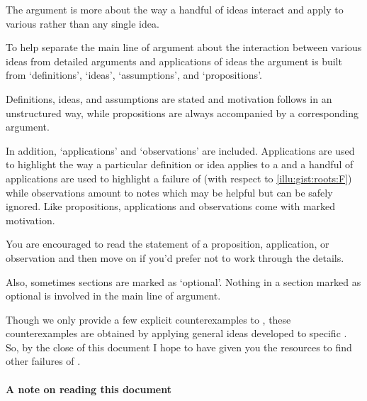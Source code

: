 \begin{note}
  The argument is more about the way a handful of ideas interact and apply to various  rather than any single idea.

  To help separate the main line of argument about the interaction between various ideas from detailed arguments and applications of ideas the argument is built from `definitions', `ideas', `assumptions', and `propositions'.

  Definitions, ideas, and assumptions are stated and motivation follows in an unstructured way, while propositions are always accompanied by a corresponding argument.

  In addition, `applications' and `observations' are included.
  Applications are used to highlight the way a particular definition or idea applies to a \scen{} and a handful of applications are used to highlight a failure of \issueInclusion{} (with respect to \autoref{illu:gist:roots:F}) while observations amount to notes which may be helpful but can be safely ignored.
  Like propositions, applications and observations come with marked motivation.

  You are encouraged to read the statement of a proposition, application, or observation and then move on if you'd prefer not to work through the details.

  Also, sometimes sections are marked as `optional'.
  Nothing in a section marked as optional is involved in the main line of argument.
\end{note}

\begin{note}
  Though we only provide a few explicit counterexamples to \issueInclusion{}, these counterexamples are obtained by applying general ideas developed to specific .
  So, by the close of this document I hope to have given you the resources to find other failures of \issueInclusion{}.
\end{note}



\paragraph*{A note on reading this document}

